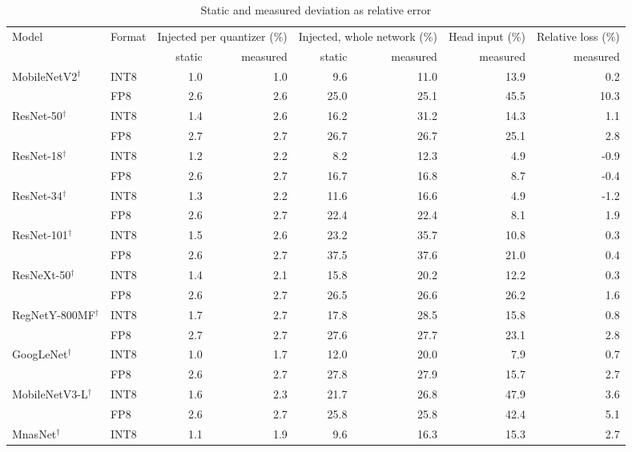 \documentclass[pdflatex,sn-mathphys-num]{sn-jnl}%
\theoremstyle{thmstyleone}%
\theoremstyle{thmstyletwo}%
\theoremstyle{thmstylethree}%
\begin{document}
\begin{appendices}
\begin{table}
\footnotesize\setlength{\tabcolsep}{4pt}
\caption{Static and measured deviation as relative error}\label{tab:staticpct}
\begin{tabular}{@{}llrrrrrr@{}}
\toprule
Model & Format & \multicolumn{2}{c}{Injected per quantizer (\%)} & \multicolumn{2}{c}{Injected, whole network (\%)} & Head input (\%) & Relative loss (\%) \\
\cmidrule{3-4}\cmidrule{5-6}
 & & static & measured & static & measured & measured & measured \\
\midrule
MobileNetV2$^\dagger$ & INT8 & 1.0 & 1.0 & 9.6 & 11.0 & 13.9 & 0.2 \\
 & FP8 & 2.6 & 2.6 & 25.0 & 25.1 & 45.5 & 10.3 \\
\midrule
ResNet-50$^\dagger$ & INT8 & 1.4 & 2.6 & 16.2 & 31.2 & 14.3 & 1.1 \\
 & FP8 & 2.7 & 2.7 & 26.7 & 26.7 & 25.1 & 2.8 \\
\midrule
ResNet-18$^\dagger$ & INT8 & 1.2 & 2.2 & 8.2 & 12.3 & 4.9 & -0.9 \\
 & FP8 & 2.6 & 2.7 & 16.7 & 16.8 & 8.7 & -0.4 \\
\midrule
ResNet-34$^\dagger$ & INT8 & 1.3 & 2.2 & 11.6 & 16.6 & 4.9 & -1.2 \\
 & FP8 & 2.6 & 2.7 & 22.4 & 22.4 & 8.1 & 1.9 \\
\midrule
ResNet-101$^\dagger$ & INT8 & 1.5 & 2.6 & 23.2 & 35.7 & 10.8 & 0.3 \\
 & FP8 & 2.6 & 2.7 & 37.5 & 37.6 & 21.0 & 0.4 \\
\midrule
ResNeXt-50$^\dagger$ & INT8 & 1.4 & 2.1 & 15.8 & 20.2 & 12.2 & 0.3 \\
 & FP8 & 2.6 & 2.7 & 26.5 & 26.6 & 26.2 & 1.6 \\
\midrule
RegNetY-800MF$^\dagger$ & INT8 & 1.7 & 2.7 & 17.8 & 28.5 & 15.8 & 0.8 \\
 & FP8 & 2.7 & 2.7 & 27.6 & 27.7 & 23.1 & 2.8 \\
\midrule
GoogLeNet$^\dagger$ & INT8 & 1.0 & 1.7 & 12.0 & 20.0 & 7.9 & 0.7 \\
 & FP8 & 2.6 & 2.7 & 27.8 & 27.9 & 15.7 & 2.7 \\
\midrule
MobileNetV3-L$^\dagger$ & INT8 & 1.6 & 2.3 & 21.7 & 26.8 & 47.9 & 3.6 \\
 & FP8 & 2.6 & 2.7 & 25.8 & 25.8 & 42.4 & 5.1 \\
\midrule
MnasNet$^\dagger$ & INT8 & 1.1 & 1.9 & 9.6 & 16.3 & 15.3 & 2.7 \\

\end{tabular}
\end{table}
\end{appendices}
\end{document}
